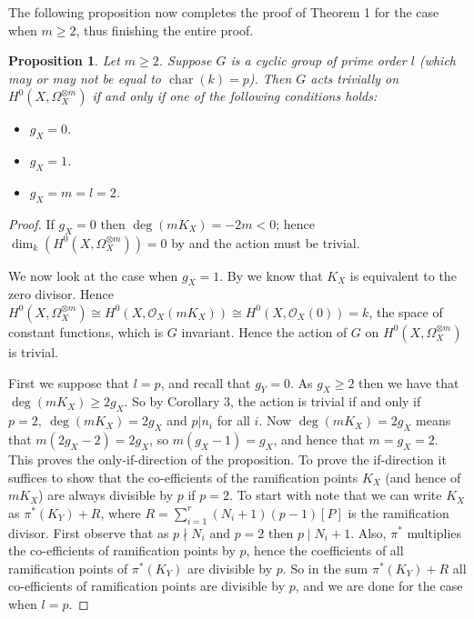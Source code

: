 \documentclass[11pt]{article} %
\newtheorem{prop}{Proposition}
\DeclareMathOperator{\cha}{char}
\begin{document}
The following proposition now completes the proof of Theorem 1 for the case when $m\geq 2$, thus finishing the entire proof.\\

  \begin{prop}\label{triv}
    Let $m \geq 2$. 
    Suppose $G$ is a cyclic group of prime order $l$ (which may or may not be equal to $\cha(k)=p$). 
    Then $G$ acts trivially on $H^0(X,\Omega_X^{\otimes m})$ if and only if one of the following conditions holds:
      \begin{itemize}
	\item $g_X=0$.
	\item $g_X=1$.
	\item $g_X=m=l=2$.
      \end{itemize}
  \end{prop}
  \begin{proof}
    If $g_X=0$ then $\deg(mK_X)=-2m<0$; hence $\dim_k(H^0(X,\Omega_X^{\otimes m}))=0$ by \cite[prop. 3, {\S}8]{fulton} and the action must be trivial.

    We now look at the case when $g_X=1$. By \cite[Chap. IV,\ Example 1.3.6]{Ha} we know that $K_X$ is equivalent to the zero divisor. 
    Hence $H^0(X,\Omega_X^{\otimes m})\cong H^0(X,\mathscr{O}_X(mK_X)) \cong H^0(X,\mathscr{O}_X(0))=k$, the space of constant functions, which is $G$ invariant. Hence the action of $G$ on $H^0(X,\Omega_X^{\otimes m})$ is trivial.



    First we suppose that $l=p$, and recall that $g_Y=0$.
    As $g_X\geq 2$ then we have that $\deg(mK_X)\geq 2g_X$. 
    So by Corollary 3, the action is trivial if and only if $p=2,\ \deg(mK_X)=2g_X$ and $p|n_i$ for all $i$. 
    Now $\deg(mK_X)=2g_X$ means that $m(2g_X-2)=2g_X$, so $m(g_X-1)=g_X$, and hence that $m=g_X=2$. 
    This proves the only-if-direction of the proposition. 
    To prove the if-direction it suffices to show that the co-efficients of the ramification points $K_X$ (and hence of $mK_X$) are always divisible by $p$ if $p=2$. 
    To start with note that we can write $K_X$ as $\pi^*(K_Y)+R$, where $R=\sum_{i=1}^r(N_i+1)(p-1)[P]$ is the ramification divisor. 
    First observe that as $p\nmid N_i$ and $p=2$ then $p\mid N_i+1$. 
    Also, $\pi^*$ multiplies the co-efficients of ramification points by $p$, hence the coefficients of all ramification points of $\pi^*(K_Y)$ are divisible by $p$. 
    So in the sum $\pi^*(K_Y)+R$ all co-efficients of ramification points are divisible by $p$, and we are done for the case when $l=p$.



\end{proof}
\end{document}
